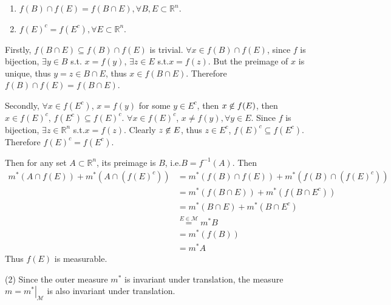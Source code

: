 \begin{enumerate}
	\item $f (B)\cap f (E)=f (B\cap E),\forall B, E\subset \mathbb{R}^{n}$.
	\item $f(E)^{c}=f(E^{c}),\forall E\subset \mathbb{R}^{n}$.
\end{enumerate}

Firstly, $f(B\cap E)\subseteq f(B)\cap f(E)$ is trivial. $\forall x\in f(B)\cap f(E)$, since $f$ is bijection, $\exists y\in B$ s.t. $x=f(y)$, $\exists z\in E$ s.t.$x=f(z)$. But the preimage of $x$ is unique, thus $y=z\in B\cap E$, thus $x\in f(B\cap E)$. Therefore $f(B)\cap f(E)=f(B\cap E)$.

Secondly, $\forall x\in f(E^{c})$, $x=f(y)$ for some $y\in E^{c}$, then $x\centernot{\in}f(E)$, then $x\in f(E)^{c}$, $f(E^{c})\subseteq f(E)^{c}$. $\forall x\in f(E)^{c}$, $x\neq f (y),\forall y\in E$. Since $f$ is bijection, $\exists z\in \mathbb{R}^{n}$ s.t.$x=f(z)$. Clearly $z\centernot{\in}E$, thus $z\in E^{c}$, $f(E)^{c}\subseteq f(E^{c})$. Therefore $f(E)^{c}=f(E^{c})$.

Then for any set $A\subset \mathbb{R}^{n}$, its preimage is $B$, i.e.$B=f^{-1}(A)$. Then
\[
\begin{aligned}
m^{*}(A\cap f(E))+m^{*}(A\cap (f(E)^{c})) & = m^{*}(f(B)\cap f(E))+m^{*}(f(B)\cap(f(E)^{c})) \\
 & =m^{*}(f(B\cap E))+m^{*}(f(B\cap E^{c})) \\
 & =m^{*}(B\cap E)+m^{*}(B\cap E^{c}) \\
 & \overset{ E\in \mathcal{M} }{ = }m^{*}B \\
 & =m^{*}(f(B)) \\
 & =m^{*}A
\end{aligned}
\]
Thus $f(E)$ is measurable.

(2) Since the outer measure $m^{*}$ is invariant under translation, the measure $m=\left.m^{*}\right|_{\mathcal{M}}$ is also invariant under translation.
